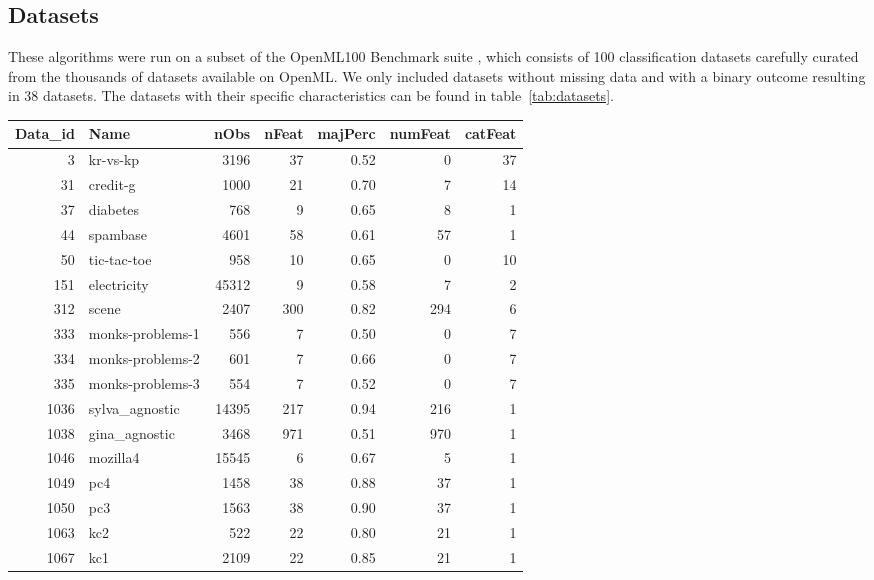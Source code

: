 \documentclass{article}
\begin{document}
\subsection{Datasets}

These algorithms were run on a subset of the OpenML100 Benchmark suite \citep{Bischl2017}, which consists of 100 classification datasets
carefully curated from the thousands of datasets available on OpenML. We only included datasets without 
missing data and with a binary outcome resulting in 38 datasets.
The datasets with their specific characteristics can be found in table~\ref{tab:datasets}.  

\begin{table}[ht]
\centering
\begingroup\scriptsize
\begin{tabular}{rlrrrrr}
  \hline
Data\_id & Name & nObs & nFeat & majPerc & numFeat & catFeat \\ 
  \hline
  3 & kr-vs-kp & 3196 &  37 & 0.52 &   0 &  37 \\ 
   31 & credit-g & 1000 &  21 & 0.70 &   7 &  14 \\ 
   37 & diabetes & 768 &   9 & 0.65 &   8 &   1 \\ 
   44 & spambase & 4601 &  58 & 0.61 &  57 &   1 \\ 
   50 & tic-tac-toe & 958 &  10 & 0.65 &   0 &  10 \\ 
  151 & electricity & 45312 &   9 & 0.58 &   7 &   2 \\ 
  312 & scene & 2407 & 300 & 0.82 & 294 &   6 \\ 
  333 & monks-problems-1 & 556 &   7 & 0.50 &   0 &   7 \\ 
  334 & monks-problems-2 & 601 &   7 & 0.66 &   0 &   7 \\ 
  335 & monks-problems-3 & 554 &   7 & 0.52 &   0 &   7 \\ 
  1036 & sylva\_agnostic & 14395 & 217 & 0.94 & 216 &   1 \\ 
  1038 & gina\_agnostic & 3468 & 971 & 0.51 & 970 &   1 \\ 
  1046 & mozilla4 & 15545 &   6 & 0.67 &   5 &   1 \\ 
  1049 & pc4 & 1458 &  38 & 0.88 &  37 &   1 \\ 
  1050 & pc3 & 1563 &  38 & 0.90 &  37 &   1 \\ 
  1063 & kc2 & 522 &  22 & 0.80 &  21 &   1 \\ 
  1067 & kc1 & 2109 &  22 & 0.85 &  21 &   1 \\ 

\end{tabular}
\end{table}
\end{document}
